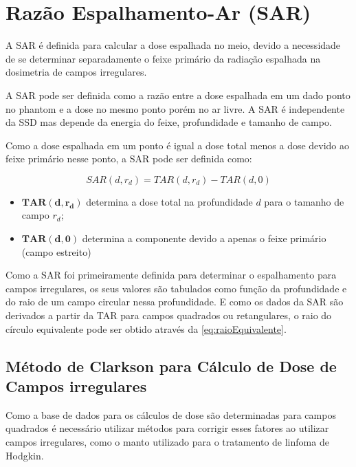 \documentclass[11pt,a4paper]{article}
\newcounter{exemplo}
\begin{document}
	\section{Razão Espalhamento-Ar (SAR)}

	A SAR é definida para calcular a dose espalhada no meio, devido a necessidade de se determinar separadamente o feixe primário da radiação espalhada na dosimetria de campos irregulares.

	A SAR pode ser definida como a razão entre a dose espalhada em um dado ponto no phantom e a dose no mesmo ponto porém no ar livre. A SAR é independente da SSD mas depende da energia do feixe, profundidade e tamanho de campo. 

	Como a dose espalhada em um ponto é igual a dose total menos a dose devido ao feixe primário nesse ponto, a SAR pode ser definida como:

		\begin{equation}
			SAR(d,r_d) = TAR(d,r_d) - TAR(d, 0)
		\end{equation}

		\begin{exemplo}[onde:]
			\begin{itemize}
				\item \textcolor{CarnationPink}{$\mathbf{TAR(d,r_d)}$} determina a dose total na profundidade $d$ para o tamanho de campo $r_d$; 
				\item \textcolor{CarnationPink}{$\mathbf{TAR(d, 0)}$} determina a componente devido a apenas o feixe primário (campo estreito)
			\end{itemize}
		\end{exemplo}

	Como a SAR foi primeiramente definida para determinar o espalhamento para campos irregulares, os seus valores são tabulados como função da profundidade e do raio de um campo circular nessa profundidade. E como os dados da SAR são derivados a partir da TAR para campos quadrados ou retangulares, o raio do círculo equivalente pode ser obtido através da \ref{eq:raioEquivalente}.

	\subsection{Método de Clarkson para Cálculo de Dose de Campos irregulares}
	
	Como a base de dados para os cálculos de dose são determinadas para campos quadrados é necessário utilizar métodos para corrigir esses fatores ao utilizar campos irregulares, como o manto utilizado para o tratamento de linfoma de Hodgkin. 
\end{document}
